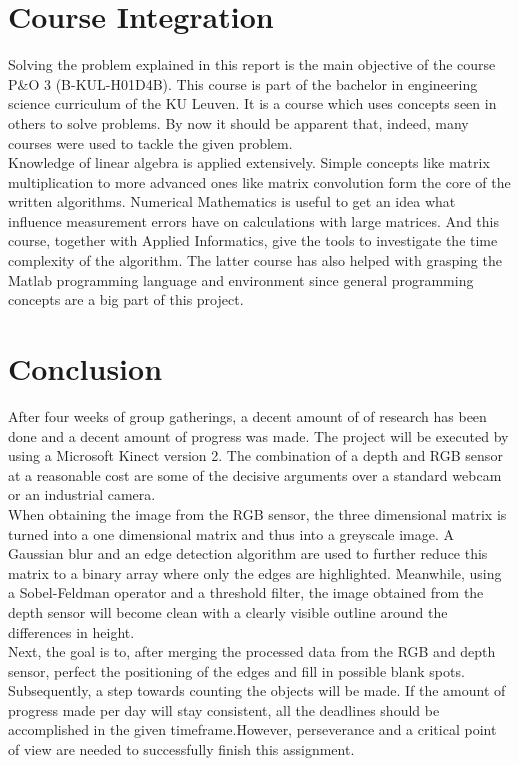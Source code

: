 \documentclass{article}
\begin{document}
\section{Course Integration}
Solving the problem explained in this report is the main objective of the course P\&O 3 (B-KUL-H01D4B). This course is part of the bachelor in engineering science curriculum of the KU Leuven. It is a course which uses concepts seen in others to solve problems. By now it should be apparent that, indeed, many courses were used to tackle the given problem.\\
Knowledge of linear algebra is applied extensively. Simple concepts like matrix multiplication to more advanced ones like matrix convolution form the core of the written algorithms. Numerical Mathematics is useful to get an idea what influence measurement errors have on calculations with large matrices. And this course, together with Applied Informatics, give the tools to investigate the time complexity of the algorithm. The latter course has also helped with grasping the Matlab programming language and environment since general programming concepts are a big part of this project.

\section{Conclusion}
After four weeks of group gatherings, a decent amount of of research has been done and a decent amount of progress was made. The project will be executed by using a Microsoft Kinect version 2. The combination of a depth and RGB sensor at a reasonable cost are some of the decisive arguments over a standard webcam or an industrial camera. \\
When obtaining the image from the RGB sensor, the three dimensional matrix is turned into a one dimensional matrix and thus into a greyscale image. A Gaussian blur and an edge detection algorithm are used to further reduce this matrix to a binary array where only the edges are highlighted. Meanwhile, using a Sobel-Feldman operator and a threshold filter, the image obtained from the depth sensor will become clean with a clearly visible outline around the differences in height. \\
Next, the goal is to, after merging the processed data from the RGB and depth sensor, perfect the positioning of the edges and fill in possible blank spots. Subsequently, a step towards counting the objects will be made. If the amount of progress made per day will stay consistent, all the deadlines should be  accomplished in the given timeframe.However, perseverance and a critical point of view are needed to successfully finish this assignment. 
\end{document}

